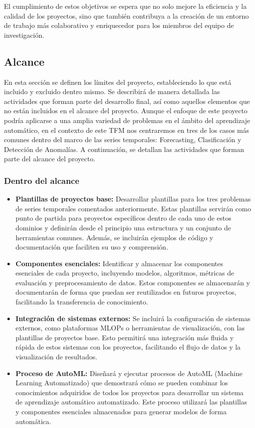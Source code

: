 El cumplimiento de estos objetivos se espera que no solo mejore la eficiencia y la calidad de los 
proyectos, sino que también contribuya a la creación de un entorno de trabajo más colaborativo y
enriquecedor para los miembros del equipo de investigación.

\subsection{Alcance}
En esta sección se definen los límites del proyecto, estableciendo lo que está
incluido y excluido dentro mismo. Se describirá de manera detallada las
actividades que forman parte del desarrollo final, así como aquellos elementos
que no están incluidos en el alcance del proyecto. Aunque el enfoque de este 
proyecto podría aplicarse a una amplia variedad de problemas en el ámbito del 
aprendizaje automático, en el contexto de este TFM nos centraremos en tres de 
los casos más comunes dentro del marco de las series temporales: Forecasting, 
Clasificación y Detección de Anomalías. A continuación, se detallan las 
actividades que forman parte del alcance del proyecto.

\subsubsection{Dentro del alcance}
\begin{itemize}
    \item \textbf{Plantillas de proyectos base:} Desarrollar plantillas para 
    los tres problemas de series temporales comentados anteriormente. Estas plantillas 
    servirán como punto de partida para proyectos específicos dentro de cada uno de estos dominios
    y definirán desde el principio una estructura y un conjunto de herramientas comunes. Además,
    se incluirán ejemplos de código y documentación que faciliten su uso y comprensión.
    \item \textbf{Componentes esenciales:} Identificar y almacenar los componentes 
    esenciales de cada proyecto, incluyendo modelos, algoritmos, métricas de evaluación y
    preprocesamiento de datos. Estos componentes se almacenarán y documentarán de forma
    que puedan ser reutilizados en futuros proyectos, facilitando la transferencia de conocimiento.
    \item \textbf{Integración de sistemas externos:} Se incluirá la configuración de sistemas 
    externos, como plataformas MLOPs o herramientas de visualización, con las plantillas 
    de proyectos base. Esto permitirá una integración más fluida y rápida de estos sistemas con 
    los proyectos, facilitando el flujo de datos y la visualización de resultados.
    \item \textbf{Proceso de AutoML:} Diseñará y ejecutar procesos de AutoML 
    (Machine Learning Automatizado) que demostrará cómo se pueden combinar los conocimientos 
    adquiridos de todos los proyectos para desarrollar un sistema de aprendizaje automático 
    automatizado. Este proceso utilizará las plantillas y componentes esenciales almacenados 
    para generar modelos de forma automática.
\end{itemize}

